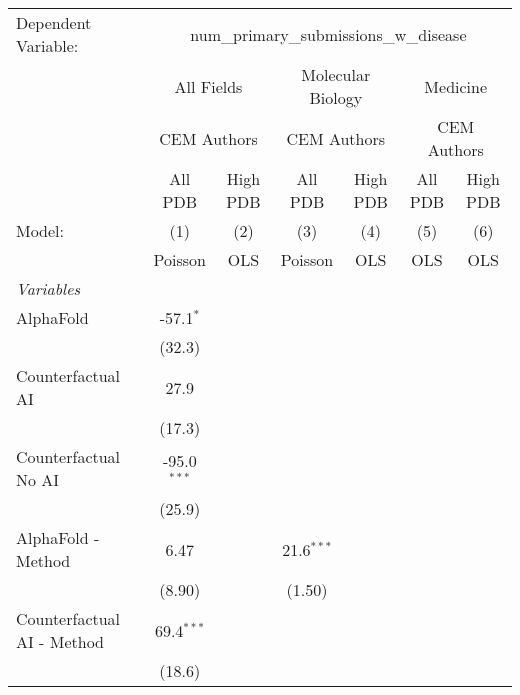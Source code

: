 \begingroup
\centering
\begin{tabular}{lcccccc}
   \tabularnewline \midrule \midrule
   Dependent Variable: & \multicolumn{6}{c}{num\_primary\_submissions\_w\_disease}\\
 & \multicolumn{2}{c}{All Fields} & \multicolumn{2}{c}{Molecular Biology} & \multicolumn{2}{c}{Medicine} \\
\cmidrule(lr){2-3} \cmidrule(lr){4-5} \cmidrule(lr){6-7}
 & \multicolumn{2}{c}{CEM Authors} & \multicolumn{2}{c}{CEM Authors} & \multicolumn{2}{c}{CEM Authors} \\
\cmidrule(lr){2-3} \cmidrule(lr){4-5} \cmidrule(lr){6-7}
 & \multicolumn{1}{c}{All PDB} & \multicolumn{1}{c}{High PDB} & \multicolumn{1}{c}{All PDB} & \multicolumn{1}{c}{High PDB} & \multicolumn{1}{c}{All PDB} & \multicolumn{1}{c}{High PDB} \\
\cmidrule(lr){2-2} \cmidrule(lr){3-3} \cmidrule(lr){4-4} \cmidrule(lr){5-5} \cmidrule(lr){6-6} \cmidrule(lr){7-7}
   Model:                        & (1)           & (2)  & (3)          & (4)  & (5)  & (6)\\  
                                 &  Poisson      & OLS  & Poisson      & OLS  & OLS  & OLS\\  
   \midrule
   \emph{Variables}\\
   AlphaFold                     & -57.1$^{*}$   &      &              &      &      &   \\   
                                 & (32.3)        &      &              &      &      &   \\   
   Counterfactual AI             & 27.9          &      &              &      &      &   \\   
                                 & (17.3)        &      &              &      &      &   \\   
   Counterfactual No AI          & -95.0$^{***}$ &      &              &      &      &   \\   
                                 & (25.9)        &      &              &      &      &   \\   
   AlphaFold - Method            & 6.47          &      & 21.6$^{***}$ &      &      &   \\   
                                 & (8.90)        &      & (1.50)       &      &      &   \\   
   Counterfactual AI - Method    & 69.4$^{***}$  &      &              &      &      &   \\   
                                 & (18.6)        &      &              &      &      &   \\   

\end{tabular}

